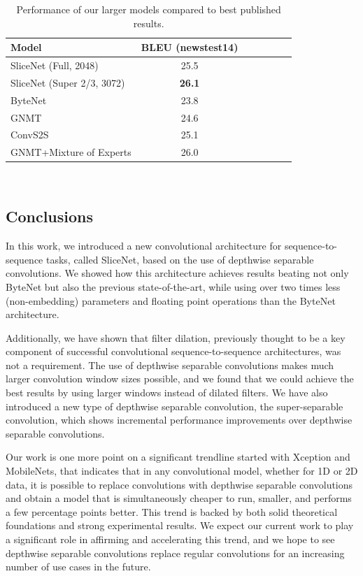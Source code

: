 \documentclass{article}
\begin{document}
\begin{table}
  \centering
  \begin{tabular}{lclcccc}
    \toprule
    Model & BLEU (newstest14) \\
    \midrule
    SliceNet (Full, 2048)      & 25.5 \\
    SliceNet (Super 2/3, 3072) & {\bf 26.1} \\
    \midrule
    ByteNet  \cite{bytenet2016}         & 23.8 \\
    GNMT  \cite{GNMT}                   & 24.6 \\
    ConvS2S  \cite{fbpaper}             & 25.1 \\
    GNMT+Mixture of Experts  \cite{moe}  & 26.0 \\
  \bottomrule
  \end{tabular}\\[4mm]
  \caption{Performance of our larger models compared to
    best published results.}
  \label{table:large_models}
\end{table}


\subsection{Conclusions}

In this work, we introduced a new convolutional architecture for sequence-to-sequence tasks, called SliceNet, based on the use of depthwise separable convolutions. We showed how this architecture achieves results beating not only ByteNet but also the previous
state-of-the-art, while using over two times less (non-embedding) parameters and floating point operations than the ByteNet architecture.

Additionally, we have shown that filter dilation, previously thought to be a key component of successful convolutional sequence-to-sequence architectures, was not a requirement. The use of depthwise separable convolutions makes much larger convolution window sizes possible, and we found that we could achieve the best results by using larger windows instead of dilated filters. We have also introduced a new type of depthwise separable convolution, the super-separable convolution, which shows incremental performance improvements over depthwise separable convolutions.

Our work is one more point on a significant trendline started with Xception and MobileNets, that indicates that in any convolutional model, whether for 1D or 2D data, it is possible to replace convolutions with depthwise separable convolutions and obtain a model that is simultaneously cheaper to run, smaller, and performs a few percentage points better. This trend is backed by both solid theoretical foundations and strong experimental results. We expect our current work to play a significant role in affirming and accelerating this trend, and we hope to see depthwise separable convolutions replace regular convolutions for an increasing number of use cases in the future.
\end{document}
